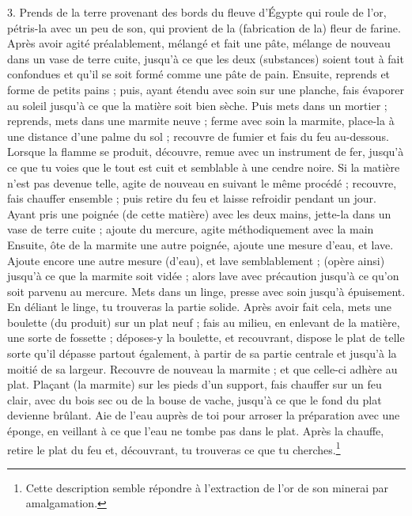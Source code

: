 \documentclass[a4paper, 11pt, oneside, polutonikogreek, french]{article}
\begin{document}
3. Prends de la terre provenant des bords du fleuve d'Égypte qui roule de l'or, pétris-la avec un peu de son, qui provient de la (fabrication de la) fleur de farine. Après avoir agité préalablement, mélangé et fait une pâte, mélange de nouveau dans un vase de terre cuite, jusqu'à ce que les deux (substances) soient tout à fait confondues et qu'il se soit formé comme une pâte de pain. Ensuite, reprends et forme de petits pains ; puis, ayant étendu avec soin sur une planche, fais évaporer au soleil jusqu'à ce que la matière soit bien sèche. Puis mets dans un mortier ; reprends, mets dans une marmite neuve ; ferme avec soin la marmite, place-la à une distance d'une palme du sol ; recouvre de fumier et fais du feu au-dessous. Lorsque la flamme se produit, découvre, remue avec un instrument de fer, jusqu'à ce que tu voies que le tout est cuit et semblable à une cendre noire. Si la matière n'est pas devenue telle, agite de nouveau en suivant le même procédé ; recouvre, fais chauffer ensemble ; puis retire du feu et laisse refroidir pendant un jour. Ayant pris une poignée (de cette matière) avec les deux mains, jette-la dans un vase de terre cuite ; ajoute du mercure, agite méthodiquement avec la main Ensuite, ôte de la marmite une autre poignée, ajoute une mesure d'eau, et lave. Ajoute encore une autre mesure (d'eau), et lave semblablement ; (opère ainsi) jusqu'à ce que la marmite soit vidée ; alors lave avec précaution jusqu'à ce qu'on soit parvenu au mercure. Mets dans un linge, presse avec soin jusqu'à épuisement. En déliant le linge, tu trouveras la partie solide. Après avoir fait cela, mets une boulette (du produit) sur un plat neuf ; fais au milieu, en enlevant de la matière, une sorte de fossette ; déposes-y la boulette, et recouvrant, dispose le plat de telle sorte qu'il dépasse partout également, à partir de sa partie centrale et jusqu'à la moitié de sa largeur. Recouvre de nouveau la marmite ; et que celle-ci adhère au plat. Plaçant (la marmite) sur les pieds d'un support, fais chauffer sur un feu clair, avec du bois sec ou de la bouse de vache, jusqu'à ce que le fond du plat devienne brûlant. Aie de l'eau auprès de toi pour arroser la préparation avec une éponge, en veillant à ce que l'eau ne tombe pas dans le plat. Après la chauffe, retire le plat du feu et, découvrant, tu trouveras ce que tu cherches.\footnote{Cette description semble répondre à l'extraction de l'or de son minerai par amalgamation.}

\bigskip
\centerline{\EightStarTaper}
\centerline{\EightStarTaper\EightStarTaper}
\bigskip
\end{document}
